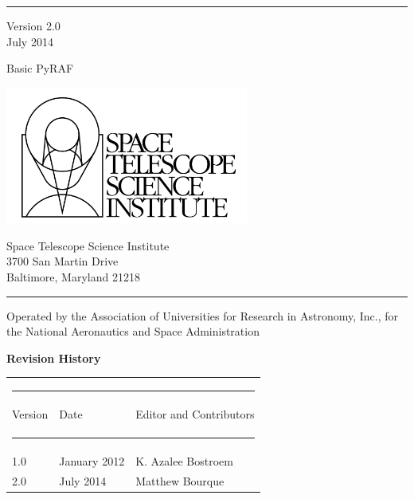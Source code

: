\begin{titlepage}
\rule{165mm}{0.8mm}
 Version 2.0 \\
 July 2014

\vspace{30mm}
{\Huge Basic PyRAF }

\vspace{80mm}

\begin{minipage}[l]{80mm}
\includegraphics[width=8cm]{logo.jpg}

\end{minipage}
%
\hspace{5mm}
\begin{minipage}[u]{75mm}
\begin{flushright}
Space Telescope Science Institute \\
3700 San Martin Drive \\
Baltimore, Maryland 21218
\end{flushright}
\end{minipage}

\rule{165mm}{0.8mm}

{\scriptsize Operated by the Association of Universities for Research in Astronomy, Inc., for the National Aeronautics and Space Administration }
 
 \newpage
  \thispagestyle{empty}  
  
{\Large \bf Revision History}



\begin{table}[h]
\begin{tabular}{lll} 
\multicolumn{3}{c}{ \rule{130mm}{0.2mm}}      \\
Version  & Date & Editor and Contributors    {\rule [-3mm]{0mm}{8mm}  }\\ 
 \multicolumn{3}{c}{ \rule[2mm]{130mm}{0.8mm}}      \\
      1.0                 &  January 2012  &K. Azalee Bostroem \\ 
      2.0                 &  July 2014  &Matthew Bourque \\
 

\end{tabular}
\end{table}
\end{titlepage}
